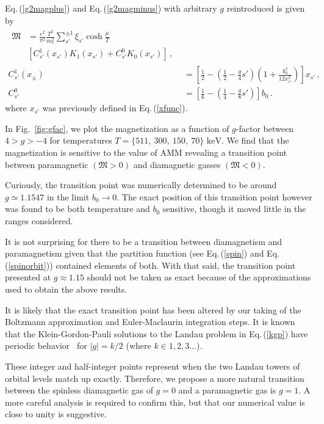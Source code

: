 \documentclass[aps,prd,floatfix,reprint]{revtex4-2}
\newcommand*{\keV}{\text{ keV}}
\newcommand{\req}[1]{Eq.\,(\ref{#1})}
\newcommand{\rf}[1]{Fig.~{\ref{#1}}}
\begin{document}
\req{g2magplus} and \req{g2magminus} with arbitrary $g$ reintroduced is given by
\begin{align}
\begin{split}
\label{arbg:1}
{\mathfrak M}&=\frac{e^{2}}{\pi^{2}}\frac{T^{2}}{m_{e}^{2}}\sum_{s'}^{\pm1}\xi_{s'}\cosh{\frac{\mu}{T}}\\
&\left[C^{1}_{s'}(x_{s'})K_{1}(x_{s'})+C^{0}_{s'}K_{0}(x_{s'})\right]\,,
\end{split}\\
\label{arbg:2}
C^{1}_{s'}(x_{\pm}) &= \left[\frac{1}{2}-\left(\frac{1}{2}-\frac{g}{4}s'\right)\left(1+\frac{b^2_0}{12x^{2}_{s'}}\right)\right]x_{s'}\,,\\
C^{0}_{s'} &= \left[\frac{1}{6}-\left(\frac{1}{4}-\frac{g}{8}s'\right)\right]b_0\,.
\end{align}
where $x_{s'}$ was previously defined in \req{xfunc}.

In \rf{fig:gfac}, we plot the magnetization as a function of $g$-factor between $4>g>-4$ for temperatures $T=\{511,\ 300,\ 150,\ 70\}\keV$. We find that the magnetization is sensitive to the value of AMM revealing a transition point between paramagnetic $({\mathfrak M}>0)$ and diamagnetic gasses $({\mathfrak M}<0)$. 

Curiously, the transition point was numerically determined to be around $g\simeq1.1547$ in the limit $b_{0}\rightarrow0$. The exact position of this transition point however was found to be both temperature and $b_{0}$ sensitive, though it moved little in the ranges considered.

It is not surprising for there to be a transition between diamagnetism and paramagnetism given that the partition function (see \req{spin} and \req{spinorbit}) contained elements of both. With that said, the transition point presented at $g\approx1.15$ should not be taken as exact because of the approximations used to obtain the above results. 

It is likely that the exact transition point has been altered by our taking of the Boltzmann approximation and Euler-Maclaurin integration steps. It is known that the Klein-Gordon-Pauli solutions to the Landau problem in \req{kgp} have periodic behavior~\cite{Steinmetz:2018ryf,Evans:2022fsu,Rafelski:2022bsv} for $|g|=k/2$ (where $k\in1,2,3\ldots$).

These integer and half-integer points represent when the two Landau towers of orbital levels match up exactly. Therefore, we propose a more natural transition between the spinless diamagnetic gas of $g=0$ and a paramagnetic gas is $g=1$. A more careful analysis is required to confirm this, but that our numerical value is close to unity is suggestive.
\end{document}

